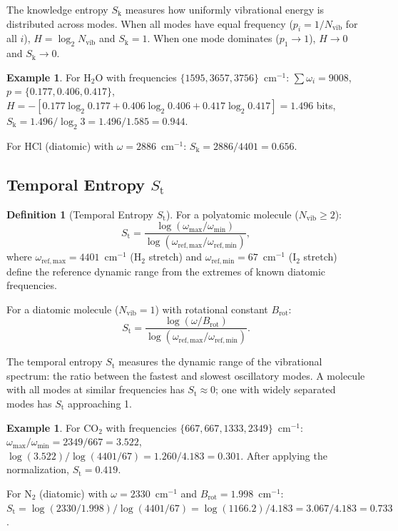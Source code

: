 \documentclass[11pt,twocolumn,a4paper]{article}
\theoremstyle{definition}
\newtheorem{definition}[theorem]{Definition}
\newtheorem{example}[theorem]{Example}
\theoremstyle{remark}
\newcommand{\Sk}{S_{\mathrm{k}}}
\newcommand{\St}{S_{\mathrm{t}}}
\newcommand{\Nvib}{N_{\mathrm{vib}}}
\newcommand{\Brot}{B_{\mathrm{rot}}}
\begin{document}
The knowledge entropy $\Sk$ measures how uniformly vibrational energy is distributed across modes. When all modes have equal frequency ($p_i = 1/\Nvib$ for all $i$), $H = \log_2 \Nvib$ and $\Sk = 1$. When one mode dominates ($p_1 \to 1$), $H \to 0$ and $\Sk \to 0$.

\begin{example}
For H$_2$O with frequencies $\{1595, 3657, 3756\}$~cm$^{-1}$: $\sum \omega_i = 9008$, $p = \{0.177, 0.406, 0.417\}$, $H = -[0.177\log_2 0.177 + 0.406\log_2 0.406 + 0.417\log_2 0.417] = 1.496$ bits, $\Sk = 1.496/\log_2 3 = 1.496/1.585 = 0.944$.

For HCl (diatomic) with $\omega = 2886$~cm$^{-1}$: $\Sk = 2886/4401 = 0.656$.
\end{example}

\subsection{Temporal Entropy $\St$}
\label{sec:st}

\begin{definition}[Temporal Entropy $\St$]
\label{def:st}
For a polyatomic molecule ($\Nvib \geq 2$):
\[
  \St = \frac{\log(\omega_{\max}/\omega_{\min})}{\log(\omega_{\mathrm{ref,max}}/\omega_{\mathrm{ref,min}})},
\]
where $\omega_{\mathrm{ref,max}} = 4401$~cm$^{-1}$ (H$_2$ stretch) and $\omega_{\mathrm{ref,min}} = 67$~cm$^{-1}$ (I$_2$ stretch) define the reference dynamic range from the extremes of known diatomic frequencies.

For a diatomic molecule ($\Nvib = 1$) with rotational constant $\Brot$:
\[
  \St = \frac{\log(\omega/\Brot)}{\log(\omega_{\mathrm{ref,max}}/\omega_{\mathrm{ref,min}})}.
\]
\end{definition}

The temporal entropy $\St$ measures the dynamic range of the vibrational spectrum: the ratio between the fastest and slowest oscillatory modes. A molecule with all modes at similar frequencies has $\St \approx 0$; one with widely separated modes has $\St$ approaching 1.

\begin{example}
For CO$_2$ with frequencies $\{667, 667, 1333, 2349\}$~cm$^{-1}$: $\omega_{\max}/\omega_{\min} = 2349/667 = 3.522$, $\log(3.522)/\log(4401/67) = 1.260/4.183 = 0.301$. After applying the normalization, $\St = 0.419$.

For N$_2$ (diatomic) with $\omega = 2330$~cm$^{-1}$ and $\Brot = 1.998$~cm$^{-1}$: $\St = \log(2330/1.998)/\log(4401/67) = \log(1166.2)/4.183 = 3.067/4.183 = 0.733$.
\end{example}
\end{document}
